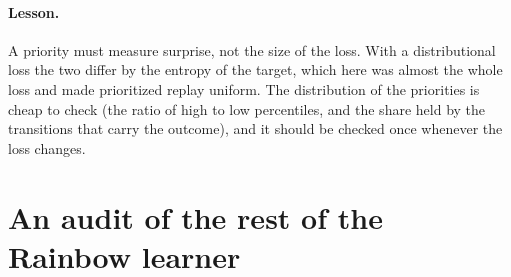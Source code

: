 \paragraph{Lesson.} A priority must measure surprise, not the size of the loss. With a
distributional loss the two differ by the entropy of the target, which here was almost the whole
loss and made prioritized replay uniform. The distribution of the priorities is cheap to check (the
ratio of high to low percentiles, and the share held by the transitions that carry the outcome),
and it should be checked once whenever the loss changes.

\section{An audit of the rest of the Rainbow learner}

